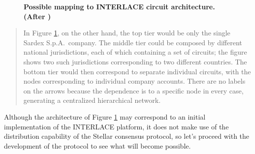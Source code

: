 \begin{center}
{{{{\vspace{-.5cm}
\begin{figure}[H]
\centering
\captionsetup{width=15cm}
\caption{\bf \small Possible mapping to INTERLACE circuit architecture. (After \cite{Mazieres2016})}
\label{fig:example2_Sardex}
\end{figure}

\begin{quote}
\vspace{-.3cm}
In Figure \ref{fig:example2_Sardex}, on the other hand, the top tier would be only the single Sardex S.p.A.\ company. The middle tier could be composed by different national jurisdictions, each of which containing a set of circuits; the figure shows two such jurisdictions corresponding to two different countries. The bottom tier would then correspond to separate individual circuits, with the nodes corresponding to individual company accounts. There are no labels on the arrows because the dependence is to a specific node in every case, generating a centralized hierarchical network.
\end{quote}
\vspace{.2cm}
}}}}
\end{center}

Although the architecture of Figure \ref{fig:example2_Sardex} may correspond to an initial implementation of the INTERLACE platform, it does not make use of the distribution capability of the Stellar consensus protocol, so let's proceed with the development of the protocol to see what will become possible.

